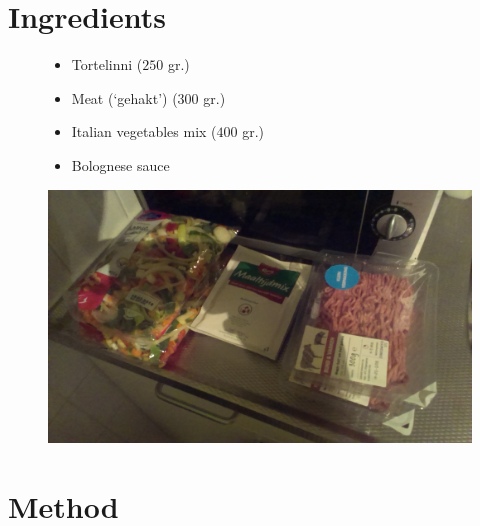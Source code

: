 \documentclass[a4paper,12pt]{report}
\begin{document}
\section*{Ingredients}
\begin{figure}[h]

\begin{minipage}{0.65\textwidth}
\begin{itemize}
\item Tortelinni ($250$ gr.)
\item Meat (`gehakt') ($300$ gr.)
\item Italian vegetables mix ($400$ gr.)
\item Bolognese sauce
\end{itemize}
\end{minipage}
\begin{minipage}{0.3\textwidth}
	\includegraphics[scale=0.07]{Images/ing.jpg}
\end{minipage}
\end{figure}


\section*{Method}
\end{document}
